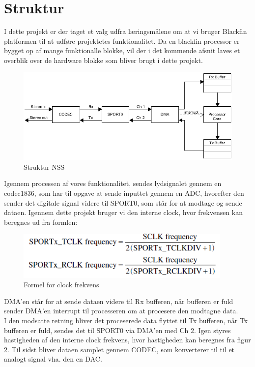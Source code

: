 \graphicspath{{Chapters/Struktur/}}

\section{Struktur}

I dette projekt er der taget et valg udfra læringsmålene om at vi bruger Blackfin platformen til at udføre projektetes funktionalitet. Da en blackfin processor er bygget op af mange funktionalle blokke, vil der i det kommende afsnit laves et overblik over de hardware blokke som bliver brugt i dette projekt. 

\begin{figure}[H]
	\centering
	\includegraphics[width = 400pt]{Img/Struktur}
	\caption{Struktur NSS}
	\label{fig:LMS_filter}
\end{figure}

Igennem processen af vores funktionalitet, sendes lydsignalet gennem en codec1836, som har til opgave at sende inputtet gennem en ADC, hvorefter den sender det digitale signal videre til SPORT0, som står for at modtage og sende dataen. Igennem dette projekt bruger vi den interne clock, hvor frekvensen kan beregnes ud fra formlen:

\begin{figure}[H]
	\centering
	\includegraphics[width = 300pt]{Img/Frekvens}
	\caption{Formel for clock frekvens}
	\label{fig:clock_frek}
\end{figure}

DMA'en står for at sende dataen videre til Rx bufferen, når bufferen er fuld sender DMA'en interrupt til processeren om at procesere den modtagne data. \\
I den modsatte retning bliver det proceserede data flyttet til Tx bufferen, når Tx bufferen er fuld, sendes det til SPORT0 via DMA'en med Ch 2. Igen styres hastigheden af den interne clock frekvens, hvor hastigheden kan beregnes fra figur \ref{fig:clock_frek}. 
Til sidst bliver dataen samplet gennem CODEC, som konverterer til til et analogt signal vha. den en DAC.
  

\newpage

